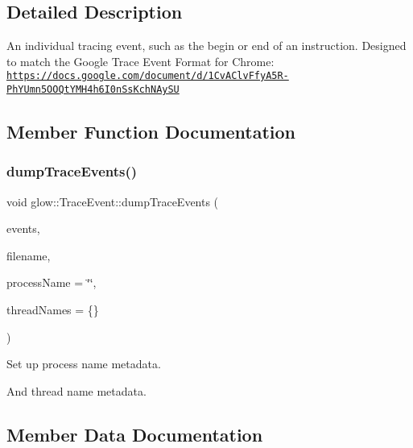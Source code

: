 \subsection{Detailed Description}
An individual tracing event, such as the begin or end of an instruction. Designed to match the Google Trace Event Format for Chrome\+: \href{https://docs.google.com/document/d/1CvAClvFfyA5R-PhYUmn5OOQtYMH4h6I0nSsKchNAySU}{\tt https\+://docs.\+google.\+com/document/d/1\+Cv\+A\+Clv\+Ffy\+A5\+R-\/\+Ph\+Y\+Umn5\+O\+O\+Qt\+Y\+M\+H4h6\+I0n\+Ss\+Kch\+N\+Ay\+SU} 

\subsection{Member Function Documentation}
\mbox{\label{structglow_1_1_trace_event_acbca9b65c5383467f89f034312d1160c}} 
\subsubsection{\texorpdfstring{dump\+Trace\+Events()}{dumpTraceEvents()}}
{\footnotesize\ttfamily void glow\+::\+Trace\+Event\+::dump\+Trace\+Events (\begin{DoxyParamCaption}\item[{std\+::vector$<$ \hyperlink{structglow_1_1_trace_event}{Trace\+Event} $>$ \&}]{events,  }\item[{llvm\+::\+String\+Ref}]{filename,  }\item[{const std\+::string \&}]{process\+Name = {\ttfamily \char`\"{}\char`\"{}},  }\item[{const std\+::map$<$ int, std\+::string $>$ \&}]{thread\+Names = {\ttfamily \{\}} }\end{DoxyParamCaption})\hspace{0.3cm}{\ttfamily [static]}}

Set up process name metadata.

And thread name metadata. 

\subsection{Member Data Documentation}
\mbox{\label{structglow_1_1_trace_event_a8babcdea3902b2e13327f4006fbbd6c2}} 
